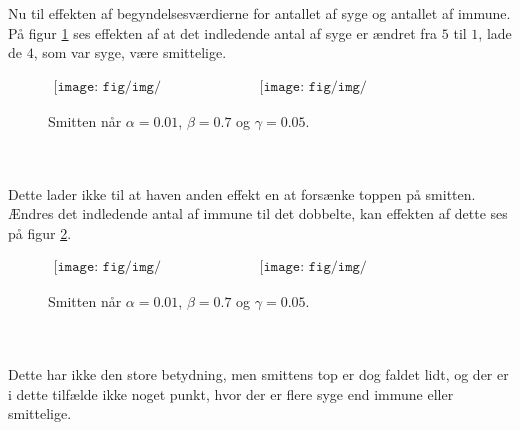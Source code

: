 %
Nu til effekten af begyndelsesværdierne for antallet af syge og antallet af immune.
På figur \ref{fig:x1_1_x2_95} ses effekten af at det indledende antal af syge er ændret fra $5$ til $1$, lade de $4$, som var syge, være smittelige.
%
\begin{figure}[!ht]
\centering
$
\begin{matrix}
\texttt{[image: fig/img/x1\_1\_x2\_95.png]}&
\texttt{[image: fig/img/t\_x1\_1\_x2\_95.png]}
\end{matrix}
$
\caption{Smitten når $\alpha = 0.01$, $\beta = 0.7$ og $\gamma = 0.05$.}
\label{fig:x1_1_x2_95}
\end{figure}\\\\
%
Dette lader ikke til at haven anden effekt en at forsænke toppen på smitten.
Ændres det indledende antal af immune til det dobbelte, kan effekten af dette ses på figur \ref{fig:x1_5_x2_85}.
%
\begin{figure}[!ht]
\centering
$
\begin{matrix}
\texttt{[image: fig/img/x1\_5\_x2\_85.png]}&
\texttt{[image: fig/img/t\_x1\_5\_x2\_85.png]}
\end{matrix}
$
\caption{Smitten når $\alpha = 0.01$, $\beta = 0.7$ og $\gamma = 0.05$.}
\label{fig:x1_5_x2_85}
\end{figure}\\\\
%
Dette har ikke den store betydning, men smittens top er dog faldet lidt, og der er i dette tilfælde ikke noget punkt, hvor der er flere syge end immune eller smittelige.
